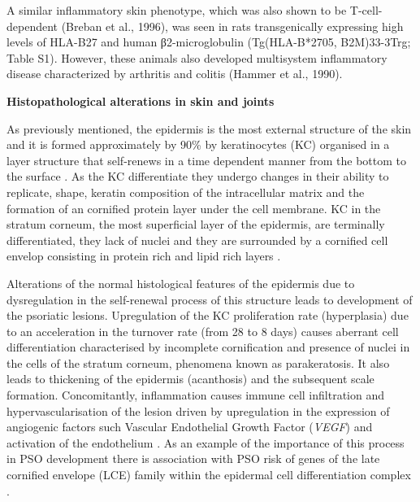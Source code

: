 A similar inflammatory skin phenotype, which was also shown to be T-cell-dependent (Breban et al., 1996), was seen in rats transgenically expressing high levels of HLA-B27 and human β2-microglobulin (Tg(HLA-B*2705, B2M)33-3Trg; Table S1). However, these animals also developed multisystem inflammatory disease characterized by arthritis and colitis (Hammer et al., 1990).


\textbf{Histopathological alterations in skin and joints}

As previously mentioned, the epidermis is the most external structure of the skin and it is formed approximately by 90\% by keratinocytes (KC) organised in a layer structure that self-renews in a time dependent manner from the bottom to the surface \parencite{Wikramanayake2014}. As the KC differentiate they undergo changes in their ability to replicate, shape, keratin composition of the intracellular matrix and the formation of an cornified protein layer under the cell membrane. KC in the stratum corneum, the most superficial layer of the epidermis, are terminally differentiated, they lack of nuclei and they are surrounded by a cornified cell envelop consisting in protein rich and lipid rich layers .

Alterations of the normal histological features of the epidermis due to dysregulation in the self-renewal process of this structure leads to development of the psoriatic lesions. Upregulation of the KC proliferation rate (hyperplasia) due to an acceleration in the turnover rate (from 28 to 8 days) causes aberrant cell differentiation characterised by incomplete cornification and presence of nuclei in the cells of the stratum corneum, phenomena known as parakeratosis. It also leads to thickening of the epidermis (acanthosis) and the subsequent scale formation. Concomitantly, inflammation causes immune cell infiltration and hypervascularisation of the lesion driven by upregulation in the expression of angiogenic factors such Vascular Endothelial Growth Factor (\textit{VEGF}) and activation of the endothelium \parencite{Perera2012}. As an example of the importance of this process in PSO development there is association with PSO risk of genes of the late cornified envelope (LCE) family within the epidermal cell differentiation complex \parencite{Tsoi2012}.

